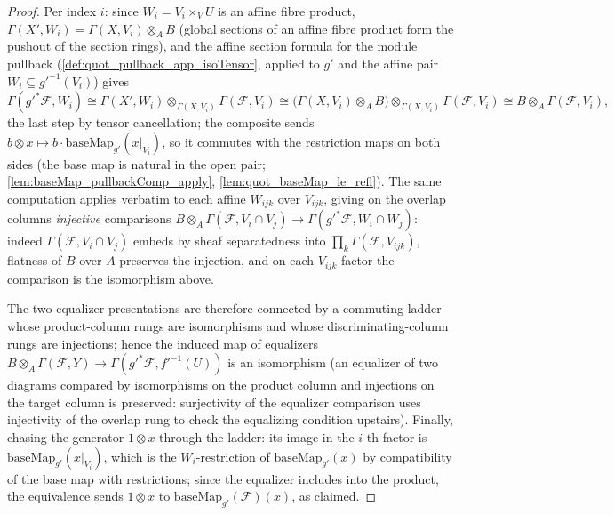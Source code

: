 \begin{proof}
  Per index \(i\): since \(W_i = V_i \times_V U\) is an affine fibre
  product, \(\Gamma(X', W_i) = \Gamma(X, V_i) \otimes_A B\) (global sections
  of an affine fibre product form the pushout of the section rings), and the
  affine section formula for the module pullback
  (\cref{def:quot_pullback_app_isoTensor}, applied to \(g'\) and the affine
  pair \(W_i \subseteq g'^{-1}(V_i)\)) gives
  \[
    \Gamma(g'^*\mathcal F, W_i)
    \cong \Gamma(X', W_i) \otimes_{\Gamma(X, V_i)} \Gamma(\mathcal F, V_i)
    \cong \bigl(\Gamma(X, V_i) \otimes_A B\bigr)
      \otimes_{\Gamma(X, V_i)} \Gamma(\mathcal F, V_i)
    \cong B \otimes_A \Gamma(\mathcal F, V_i),
  \]
  the last step by tensor cancellation; the composite sends
  \(b \otimes x \mapsto b \cdot \mathrm{baseMap}_{g'}(x|_{V_i})\), so it
  commutes with the restriction maps on both sides (the base map is
  natural in the open pair; \cref{lem:baseMap_pullbackComp_apply},
  \cref{lem:quot_baseMap_le_refl}). The same computation applies verbatim
  to each affine \(W_{ijk}\) over \(V_{ijk}\), giving on the overlap
  columns \emph{injective} comparisons
  \(B \otimes_A \Gamma(\mathcal F, V_i \cap V_j) \to
    \Gamma(g'^*\mathcal F, W_i \cap W_j)\):
  indeed \(\Gamma(\mathcal F, V_i \cap V_j)\) embeds by sheaf separatedness
  into \(\prod_k \Gamma(\mathcal F, V_{ijk})\), flatness of \(B\) over \(A\)
  preserves the injection, and on each \(V_{ijk}\)-factor the comparison is
  the isomorphism above.

  The two equalizer presentations are therefore connected by a commuting
  ladder whose product-column rungs are isomorphisms and whose
  discriminating-column rungs are injections; hence the induced map of
  equalizers
  \(B \otimes_A \Gamma(\mathcal F, Y) \to
    \Gamma(g'^*\mathcal F, f'^{-1}(U))\)
  is an isomorphism (an equalizer of two diagrams compared by isomorphisms
  on the product column and injections on the target column is preserved:
  surjectivity of the equalizer comparison uses injectivity of the overlap
  rung to check the equalizing condition upstairs). Finally, chasing the
  generator \(1 \otimes x\) through the ladder: its image in the \(i\)-th
  factor is \(\mathrm{baseMap}_{g'}(x|_{V_i})\), which is the
  \(W_i\)-restriction of \(\mathrm{baseMap}_{g'}(x)\) by compatibility of
  the base map with restrictions; since the equalizer includes into the
  product, the equivalence sends \(1 \otimes x\) to
  \(\mathrm{baseMap}_{g'}(\mathcal F)(x)\), as claimed.
\end{proof}

